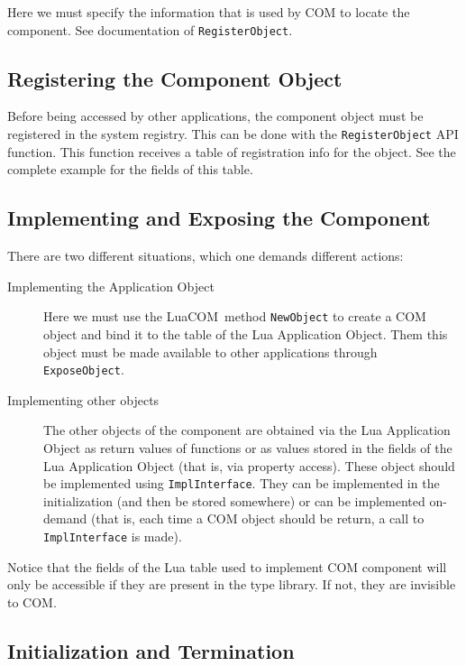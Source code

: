 \documentclass[11pt,a4paper,english]{report}
\newcommand{\techname}[1]{\mbox{#1}}
\newcommand{\luacom}{\techname{LuaCOM}}
\begin{document}
Here we must specify the information that is used by COM to locate the
component. See documentation of \verb+RegisterObject+.


\subsection{Registering the Component Object}

Before being accessed by other applications, the component object must
be registered in the system registry. This can be done with the \verb+RegisterObject+ API function.
This function receives a table of registration info for
the object. See the complete example for the fields of this table.



\subsection{Implementing and Exposing the Component}

There are two different situations, which one demands different
actions:

\begin{description}
\item [Implementing the Application Object] Here we must use the
\luacom\ method \verb+NewObject+ to create a COM object and
bind it to the table of the Lua Application Object. Them this object must
be made available to other applications through \verb+ExposeObject+.

\item [Implementing other objects] The other objects of the component
are obtained via the Lua Application Object as return values of
functions or as values stored in the fields of the Lua Application
Object (that is, via property access). These object should be
implemented using \verb+ImplInterface+. They can be implemented
in the initialization (and then be stored somewhere) or can be
implemented on-demand (that is, each time a COM object should be
return, a call to \verb+ImplInterface+ is made).
\end{description}

Notice that the fields of the Lua table used to implement COM
component will only be accessible if they are present in the type
library. If not, they are invisible to COM.


\subsection{Initialization and Termination}
\end{document}
